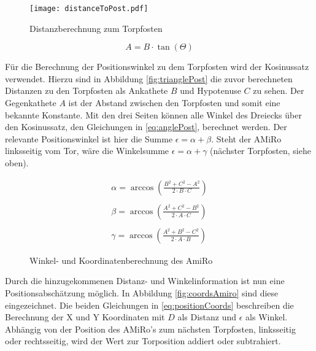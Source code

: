 \begin{figure}[h]
	\begin{center}
		\texttt{[image: distanceToPost.pdf]} 	
		\caption{Distanzberechnung zum Torpfosten}
		\label{fig:distToPost}
	\end{center}
\end{figure}

\begin{equation}
	A = B \cdot \tan(\Theta)
	\label{eq:distanceToPost}
\end{equation}

Für die Berechnung der Positionswinkel zu dem Torpfosten wird der Kosinussatz verwendet. Hierzu sind in Abbildung \ref{fig:trianglePost} die zuvor berechneten Distanzen zu den Torpfosten als Ankathete $B$ und Hypotenuse $C$ zu sehen. Der Gegenkathete $A$ ist der Abstand zwischen den Torpfosten und somit eine bekannte Konstante. Mit den drei Seiten können alle Winkel des Dreiecks über den Kosinussatz, den Gleichungen in \ref{eq:anglePost}, berechnet werden. Der relevante Positionswinkel ist hier die Summe $\epsilon = \alpha + \beta$. Steht der AMiRo linksseitig vom Tor, wäre die Winkelsumme $\epsilon = \alpha + \gamma$ (nächster Torpfosten, siehe oben). 

\begin{equation}
	\begin{aligned}
		\alpha = \arccos(\frac{B^2 + C^2 - A^2}{2 \cdot B \cdot C}) \\\\
		\beta = \arccos(\frac{A^2 + C^2 - B^2}{2 \cdot A \cdot C}) \\\\
		\gamma = \arccos(\frac{A^2 + B^2 - C^2}{2 \cdot A \cdot B})
		\label{eq:anglePost}
	\end{aligned}
\end{equation}

\begin{figure} []
	 \hspace{2cm}
	\caption{Winkel- und Koordinatenberechnung des AmiRo} 
	\label{fig:triangleAndCoordsPost}
\end{figure}

Durch die hinzugekommenen Distanz- und Winkelinformation ist nun eine Positionsabschätzung möglich. In Abbildung \ref{fig:coordsAmiro} sind diese eingezeichnet. Die beiden Gleichungen in \ref{eq:positionCoords} beschreiben die Berechnung der X und Y Koordinaten mit $D$ als Distanz und $\epsilon$ als Winkel. Abhängig von der Position des AMiRo's zum nächsten Torpfosten, linksseitig oder rechtsseitig, wird der Wert zur Torposition addiert oder subtrahiert.

